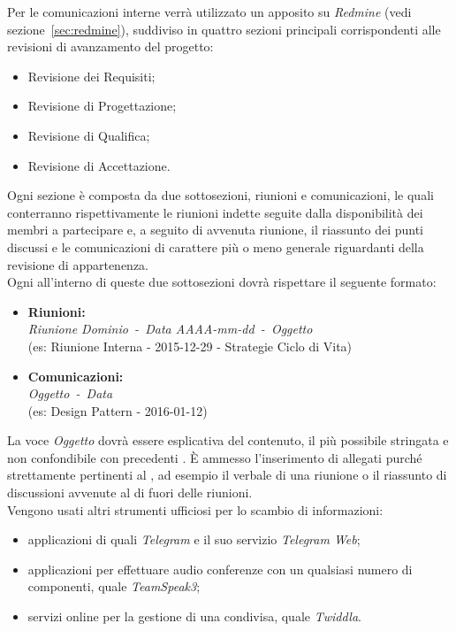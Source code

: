 \documentclass{scalatekids-article}
\begin{document}
\label{sec:ComunicazioniInterne}
Per le comunicazioni interne verrà utilizzato un  apposito su
\textit{Redmine} (vedi sezione~\ref{sec:redmine}), suddiviso in quattro sezioni
principali corrispondenti alle revisioni di avanzamento del progetto:
\begin{itemize}
\item Revisione dei Requisiti;
\item Revisione di Progettazione;
\item Revisione di Qualifica;
\item Revisione di Accettazione.
\end{itemize}
Ogni sezione è composta da due sottosezioni, riunioni e comunicazioni, le quali
conterranno rispettivamente le riunioni indette seguite dalla disponibilità dei
membri a partecipare e, a seguito di avvenuta riunione, il riassunto dei punti
discussi e le comunicazioni di carattere più o meno generale riguardanti
 della revisione di appartenenza.\\ Ogni  all'interno di
queste due sottosezioni dovrà rispettare il seguente formato:
\begin{itemize}
\item\textbf{Riunioni:}\\
  \textit{Riunione Dominio\ -\ Data AAAA-mm-dd\ -\ Oggetto}\\
  (es: Riunione Interna - 2015-12-29 - Strategie Ciclo di Vita)
\item\textbf{Comunicazioni:}\\
  \textit{Oggetto\ -\ Data}\\
  (es: Design Pattern - 2016-01-12)
\end{itemize}
La voce \textit{Oggetto} dovrà essere esplicativa del contenuto, il più
possibile stringata e non confondibile con precedenti . È ammesso
l'inserimento di allegati purché strettamente pertinenti al , ad
esempio il verbale di una riunione o il riassunto di discussioni avvenute al di
fuori delle riunioni.\\ Vengono usati altri strumenti ufficiosi per lo scambio
di informazioni:
\begin{itemize}
\item applicazioni di  quali \textit{Telegram} e il suo servizio \textit{Telegram Web};
\item applicazioni  per effettuare audio conferenze con un qualsiasi numero di componenti, quale \textit{TeamSpeak3};
\item servizi online per la gestione di una  condivisa, quale \textit{Twiddla}.
\end{itemize}
\end{document}
